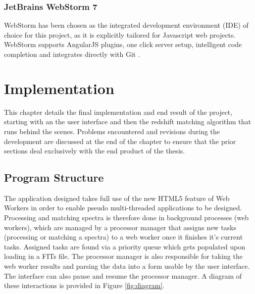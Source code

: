 \documentclass[titlesmallcaps, examinerscopy, copyrightpage]{uqthesis}
\begin{document}
\subsection{JetBrains WebStorm 7}

WebStorm has been chosen as the integrated development environment (IDE) of choice for this project, as it is explicitly tailored for Javascript web projects. WebStorm supports AngularJS plugins, one click server setup, intelligent code completion and integrates directly with Git \cite{WebStorm}.








































\chapter{Implementation}
\label{ch:impl}

This chapter details the final implementation and end result of the project, starting with an the user interface and then the redshift matching algorithm that runs behind the scenes. Problems encountered and revisions during the development are discussed at the end of the chapter to ensure that the prior sections deal exclusively with the end product of the thesis.


\section{Program Structure}

The application designed takes full use of the new HTML5 feature of Web Workers in order to enable pseudo multi-threaded applications to be designed. Processing and matching spectra is therefore done in background processes (web workers), which are managed by a processor manager that assigns new tasks (processing or matching a spectra) to a web worker once it finishes it's current tasks. Assigned tasks are found via a priority queue which gets populated upon loading in a FITs file. The processor manager is also responsible for taking the web worker results and parsing the data into a form usable by the user interface. The interface can also pause and resume the processor manager. A diagram of these interactions is provided in Figure \ref{fig:diagram}.
\end{document}
